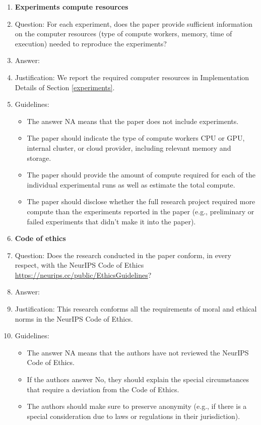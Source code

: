 \documentclass{article}
\begin{document}
\begin{enumerate}
\item {\bf Experiments compute resources}
    \item[] Question: For each experiment, does the paper provide sufficient information on the computer resources (type of compute workers, memory, time of execution) needed to reproduce the experiments?
    \item[] Answer: \answerYes{} %
    \item[] Justification: We report the required computer resources in Implementation Details of Section \ref{experiments}.
    \item[] Guidelines:
    \begin{itemize}
        \item The answer NA means that the paper does not include experiments.
        \item The paper should indicate the type of compute workers CPU or GPU, internal cluster, or cloud provider, including relevant memory and storage.
        \item The paper should provide the amount of compute required for each of the individual experimental runs as well as estimate the total compute. 
        \item The paper should disclose whether the full research project required more compute than the experiments reported in the paper (e.g., preliminary or failed experiments that didn't make it into the paper). 
    \end{itemize}
    
\item {\bf Code of ethics}
    \item[] Question: Does the research conducted in the paper conform, in every respect, with the NeurIPS Code of Ethics \url{https://neurips.cc/public/EthicsGuidelines}?
    \item[] Answer: \answerYes{} %
    \item[] Justification:  This research conforms all the requirements of moral and ethical norms in the NeurIPS Code of Ethics.
    \item[] Guidelines:
    \begin{itemize}
        \item The answer NA means that the authors have not reviewed the NeurIPS Code of Ethics.
        \item If the authors answer No, they should explain the special circumstances that require a deviation from the Code of Ethics.
        \item The authors should make sure to preserve anonymity (e.g., if there is a special consideration due to laws or regulations in their jurisdiction).
    \end{itemize}



\end{enumerate}
\end{document}
